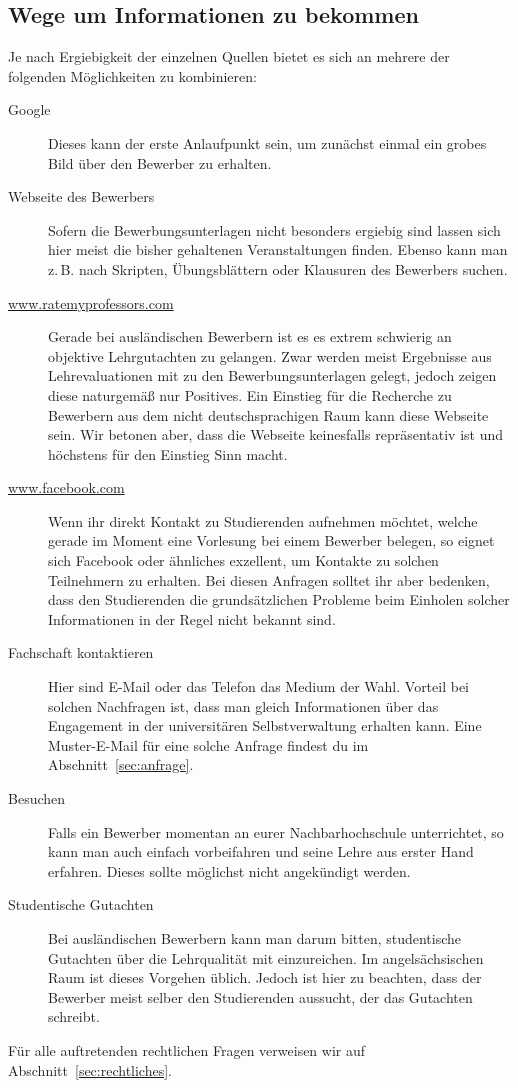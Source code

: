 \subsection{Wege um Informationen zu bekommen}
Je nach Ergiebigkeit der einzelnen Quellen bietet es sich an mehrere der folgenden Möglichkeiten zu kombinieren:
\begin{description}
    \item [Google]
          Dieses kann der erste Anlaufpunkt sein, um zunächst einmal ein grobes Bild über den Bewerber zu erhalten.
    \item [Webseite des Bewerbers]
          Sofern die Bewerbungsunterlagen nicht besonders ergiebig sind lassen sich hier meist die bisher gehaltenen Veranstaltungen finden. Ebenso kann man z.\,B. nach Skripten, Übungsblättern oder Klausuren des Bewerbers suchen.
    \item [\url{www.ratemyprofessors.com}]
          Gerade bei ausländischen Bewerbern ist es es extrem schwierig an objektive Lehrgutachten zu gelangen. Zwar werden meist Ergebnisse aus Lehrevaluationen mit zu den Bewerbungsunterlagen gelegt, jedoch zeigen diese naturgemäß nur Positives. Ein Einstieg für die Recherche zu Bewerbern aus dem nicht deutschsprachigen Raum kann diese Webseite sein. Wir betonen aber, dass die Webseite keinesfalls repräsentativ ist und höchstens für den Einstieg Sinn macht.
    \item [\url{www.facebook.com}]
          Wenn ihr direkt Kontakt zu Studierenden aufnehmen möchtet, welche gerade im Moment eine Vorlesung bei einem Bewerber belegen, so eignet sich Facebook oder ähnliches exzellent, um Kontakte zu solchen Teilnehmern zu erhalten. Bei diesen Anfragen solltet ihr aber bedenken, dass den Studierenden die grundsätzlichen Probleme beim Einholen solcher Informationen in der Regel nicht bekannt sind.
    \item [Fachschaft kontaktieren]
          Hier sind E-Mail oder das Telefon das Medium der Wahl. Vorteil bei solchen Nachfragen ist, dass man gleich Informationen über das Engagement in der universitären Selbstverwaltung erhalten kann. Eine Muster-E-Mail für eine solche Anfrage findest du im Abschnitt~\ref{sec:anfrage}.
    \item [Besuchen]
          Falls ein Bewerber momentan an eurer Nachbarhochschule unterrichtet, so kann man auch einfach vorbeifahren und seine Lehre aus erster Hand erfahren. Dieses sollte möglichst nicht angekündigt werden.
    \item [Studentische Gutachten]
          Bei ausländischen Bewerbern kann man darum bitten, studentische Gutachten über die Lehrqualität mit einzureichen. Im angelsächsischen Raum ist dieses Vorgehen üblich. Jedoch ist hier zu beachten, dass der Bewerber meist selber den Studierenden aussucht, der das Gutachten schreibt.
\end{description}

Für alle auftretenden rechtlichen Fragen verweisen wir auf Abschnitt~\ref{sec:rechtliches}.

